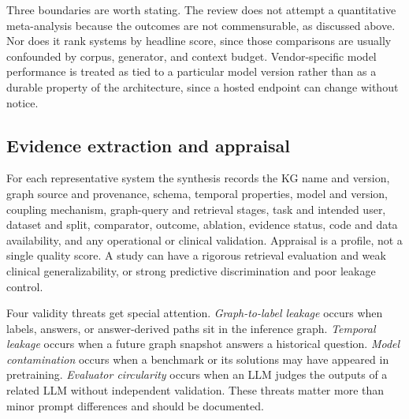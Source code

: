 Three boundaries are worth stating. The review does not attempt a quantitative meta-analysis because the outcomes are not commensurable, as discussed above. Nor does it rank systems by headline score, since those comparisons are usually confounded by corpus, generator, and context budget. Vendor-specific model performance is treated as tied to a particular model version rather than as a durable property of the architecture, since a hosted endpoint can change without notice.

\subsection{Evidence extraction and appraisal}

For each representative system the synthesis records the KG name and version, graph source and provenance, schema, temporal properties, model and version, coupling mechanism, graph-query and retrieval stages, task and intended user, dataset and split, comparator, outcome, ablation, evidence status, code and data availability, and any operational or clinical validation. Appraisal is a profile, not a single quality score. A study can have a rigorous retrieval evaluation and weak clinical generalizability, or strong predictive discrimination and poor leakage control.

Four validity threats get special attention. \emph{Graph-to-label leakage} occurs when labels, answers, or answer-derived paths sit in the inference graph. \emph{Temporal leakage} occurs when a future graph snapshot answers a historical question. \emph{Model contamination} occurs when a benchmark or its solutions may have appeared in pretraining. \emph{Evaluator circularity} occurs when an LLM judges the outputs of a related LLM without independent validation. These threats matter more than minor prompt differences and should be documented.

